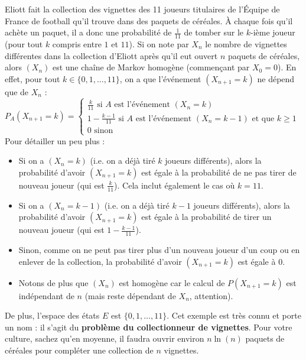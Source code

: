 	\begin{tip}[Exemple]
		\contentwidth[big]
		Eliott fait la collection des vignettes des 11 joueurs titulaires de l'Équipe de France de football qu'il trouve dans des paquets de céréales. À chaque fois qu'il achète un paquet, il a donc une probabilité de $\frac{1}{11}$ de tomber sur le $k$-ième joueur (pour tout $k$ compris entre $1$ et $11$).
		\newpar
		Si on note par $X_n$ le nombre de vignettes différentes dans la collection d'Eliott après qu'il eut ouvert $n$ paquets de céréales, alors $(X_n)$ est une chaîne de Markov homogène (commençant par $X_0 = 0$). En effet, pour tout $k \in \{0, 1, \dots, 11\}$, on a que l'événement $(X_{n+1} = k)$ ne dépend que de $X_n$ :
		\newpar
		$\displaystyle{P_A(X_{n+1} = k) = \begin{cases}
				\frac{k}{11} \text{ si } A \text{ est l'événement } (X_n = k) \\
				1 - \frac{k-1}{11} \text{ si } A \text{ est l'événement } (X_n = k-1) \text{ et que } k \geq 1 \\
				0 \text{ sinon}
		\end{cases}}$
		\newpar
		Pour détailler un peu plus :
		\begin{itemize}
			\item Si on a $(X_n = k)$ (i.e. on a déjà tiré $k$ joueurs différents), alors la probabilité d'avoir $(X_{n+1} = k)$ est égale à la probabilité de ne pas tirer de nouveau joueur (qui est $\frac{k}{11}$). Cela inclut également le cas où $k = 11$.
			\item Si on a $(X_n = k-1)$ (i.e. on a déjà tiré $k-1$ joueurs différents), alors la probabilité d'avoir $(X_{n+1} = k)$ est égale à la probabilité de tirer un nouveau joueur (qui est $1 - \frac{k-1}{11}$).
			\item Sinon, comme on ne peut pas tirer plus d'un nouveau joueur d'un coup ou en enlever de la collection, la probabilité d'avoir $(X_{n+1} = k)$ est égale à $0$.
			\item Notons de plus que $(X_n)$ est homogène car le calcul de $P(X_{n+1} = k)$ est indépendant de $n$ (mais reste dépendant de $X_n$, attention).
		\end{itemize}
		De plus, l'espace des états $E$ est $\{0, 1, \dots, 11\}$.
		\newpar
		Cet exemple est très connu et porte un nom : il s'agit du \textbf{problème du collectionneur de vignettes}. Pour votre culture, sachez qu'en moyenne, il faudra ouvrir environ $n \ln(n)$ paquets de céréales pour compléter une collection de $n$ vignettes.
	\end{tip}

